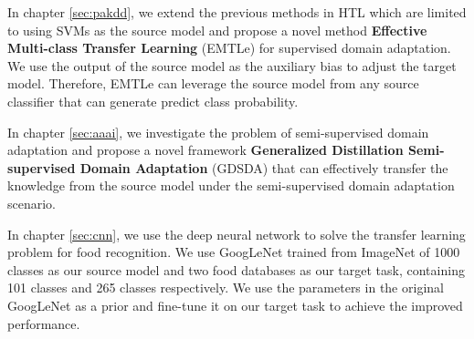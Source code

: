 In chapter \ref{sec:pakdd}, we extend the previous methods in HTL which are limited to using SVMs as the source model and propose a novel method \textbf{Effective Multi-class Transfer Learning} (EMTLe) for supervised domain adaptation. We use the output of the source model as the auxiliary bias to adjust the target model. Therefore, EMTLe can leverage the source model from any source classifier that can generate predict class probability.

In chapter \ref{sec:aaai}, we investigate the problem of semi-supervised domain adaptation and propose a novel framework \textbf{Generalized Distillation Semi-supervised Domain Adaptation} (GDSDA) that can effectively transfer the knowledge from the source model under the semi-supervised domain adaptation scenario. 

In chapter \ref{sec:cnn}, we use the deep neural network to solve the transfer learning problem for food recognition. We use GoogLeNet trained from ImageNet of 1000 classes as our source model and two food databases as our target task, containing 101 classes and 265 classes respectively. We use the parameters in the original GoogLeNet as a prior and fine-tune it on our target task to achieve the improved performance.